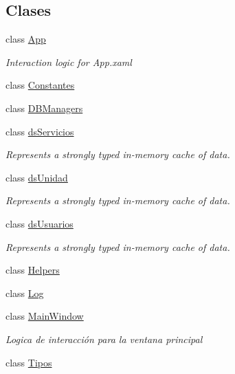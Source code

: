 \subsection*{Clases}
\begin{DoxyCompactItemize}
\item 
class \hyperlink{class_proyecto___integrador__3_1_1_app}{App}
\begin{DoxyCompactList}\small\item\em Interaction logic for App.\-xaml \end{DoxyCompactList}\item 
class \hyperlink{class_proyecto___integrador__3_1_1_constantes}{Constantes}
\item 
class \hyperlink{class_proyecto___integrador__3_1_1_d_b_managers}{D\-B\-Managers}
\item 
class \hyperlink{class_proyecto___integrador__3_1_1ds_servicios}{ds\-Servicios}
\begin{DoxyCompactList}\small\item\em Represents a strongly typed in-\/memory cache of data. \end{DoxyCompactList}\item 
class \hyperlink{class_proyecto___integrador__3_1_1ds_unidad}{ds\-Unidad}
\begin{DoxyCompactList}\small\item\em Represents a strongly typed in-\/memory cache of data. \end{DoxyCompactList}\item 
class \hyperlink{class_proyecto___integrador__3_1_1ds_usuarios}{ds\-Usuarios}
\begin{DoxyCompactList}\small\item\em Represents a strongly typed in-\/memory cache of data. \end{DoxyCompactList}\item 
class \hyperlink{class_proyecto___integrador__3_1_1_helpers}{Helpers}
\item 
class \hyperlink{class_proyecto___integrador__3_1_1_log}{Log}
\item 
class \hyperlink{class_proyecto___integrador__3_1_1_main_window}{Main\-Window}
\begin{DoxyCompactList}\small\item\em Logica de interacción para la ventana principal \end{DoxyCompactList}\item 
class \hyperlink{class_proyecto___integrador__3_1_1_tipos}{Tipos}
\end{DoxyCompactItemize}
